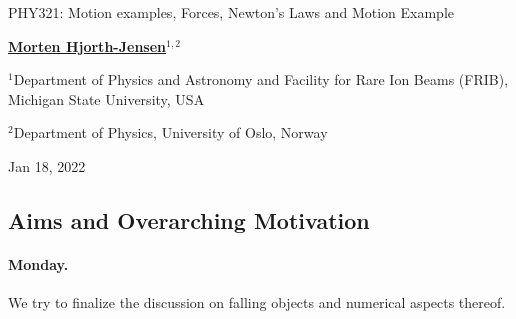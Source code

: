 \documentclass[%
oneside,                 %
final,                   %
10pt]{article}
\begin{document}

\newcommand{\exercisesection}[1]{\subsection*{#1}}






\thispagestyle{empty}

\begin{center}
{\LARGE\bf
\begin{spacing}{1.25}
PHY321: Motion examples, Forces, Newton's Laws and Motion Example
\end{spacing}
}
\end{center}


\begin{center}
{\bf \href{{http://mhjgit.github.io/info/doc/web/}}{Morten Hjorth-Jensen}${}^{1, 2}$} \\ [0mm]
\end{center}

\begin{center}
\centerline{{\small ${}^1$Department of Physics and Astronomy and Facility for Rare Ion Beams (FRIB), Michigan State University, USA}}
\centerline{{\small ${}^2$Department of Physics, University of Oslo, Norway}}
\end{center}
    

\begin{center}
Jan 18, 2022
\end{center}

\vspace{1cm}


\subsection{Aims and Overarching Motivation}

\paragraph{Monday.}
We try to finalize the discussion on falling objects and numerical aspects thereof.
\end{document}
